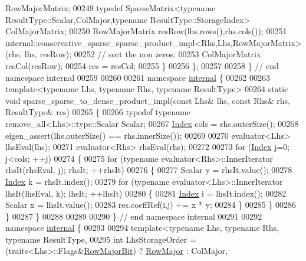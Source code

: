 \begin{DoxyCode}
      RowMajorMatrix;
00249     \textcolor{keyword}{typedef} SparseMatrix<typename ResultType::Scalar,ColMajor,typename ResultType::StorageIndex> 
      ColMajorMatrix;
00250     RowMajorMatrix resRow(lhs.rows(),rhs.cols());
00251     internal::conservative\_sparse\_sparse\_product\_impl<Rhs,Lhs,RowMajorMatrix>(rhs, lhs, resRow);
00252     \textcolor{comment}{// sort the non zeros:}
00253     ColMajorMatrix resCol(resRow);
00254     res = resCol;
00255   \}
00256 \};
00257 
00258 \} \textcolor{comment}{// end namespace internal}
00259 
00260 
00261 \textcolor{keyword}{namespace }\hyperlink{namespaceinternal}{internal} \{
00262 
00263 \textcolor{keyword}{template}<\textcolor{keyword}{typename} Lhs, \textcolor{keyword}{typename} Rhs, \textcolor{keyword}{typename} ResultType>
00264 \textcolor{keyword}{static} \textcolor{keywordtype}{void} sparse\_sparse\_to\_dense\_product\_impl(\textcolor{keyword}{const} Lhs& lhs, \textcolor{keyword}{const} Rhs& rhs, ResultType& res)
00265 \{
00266   \textcolor{keyword}{typedef} \textcolor{keyword}{typename} remove\_all<Lhs>::type::Scalar Scalar;
00267   \hyperlink{namespace_eigen_a62e77e0933482dafde8fe197d9a2cfde}{Index} cols = rhs.outerSize();
00268   eigen\_assert(lhs.outerSize() == rhs.innerSize());
00269 
00270   evaluator<Lhs> lhsEval(lhs);
00271   evaluator<Rhs> rhsEval(rhs);
00272 
00273   \textcolor{keywordflow}{for} (\hyperlink{namespace_eigen_a62e77e0933482dafde8fe197d9a2cfde}{Index} j=0; j<cols; ++j)
00274   \{
00275     \textcolor{keywordflow}{for} (\textcolor{keyword}{typename} evaluator<Rhs>::InnerIterator rhsIt(rhsEval, j); rhsIt; ++rhsIt)
00276     \{
00277       Scalar y = rhsIt.value();
00278       \hyperlink{namespace_eigen_a62e77e0933482dafde8fe197d9a2cfde}{Index} k = rhsIt.index();
00279       \textcolor{keywordflow}{for} (\textcolor{keyword}{typename} evaluator<Lhs>::InnerIterator lhsIt(lhsEval, k); lhsIt; ++lhsIt)
00280       \{
00281         \hyperlink{namespace_eigen_a62e77e0933482dafde8fe197d9a2cfde}{Index} i = lhsIt.index();
00282         Scalar x = lhsIt.value();
00283         res.coeffRef(i,j) += x * y;
00284       \}
00285     \}
00286   \}
00287 \}
00288 
00289 
00290 \} \textcolor{comment}{// end namespace internal}
00291 
00292 \textcolor{keyword}{namespace }\hyperlink{namespaceinternal}{internal} \{
00293 
00294 \textcolor{keyword}{template}<\textcolor{keyword}{typename} Lhs, \textcolor{keyword}{typename} Rhs, \textcolor{keyword}{typename} ResultType,
00295   \textcolor{keywordtype}{int} LhsStorageOrder = (traits<Lhs>::Flags&\hyperlink{group__flags_gae4f56c2a60bbe4bd2e44c5b19cbe8762}{RowMajorBit}) ? \hyperlink{group__enums_ggaacded1a18ae58b0f554751f6cdf9eb13acfcde9cd8677c5f7caf6bd603666aae3}{RowMajor} : ColMajor,

\end{DoxyCode}
